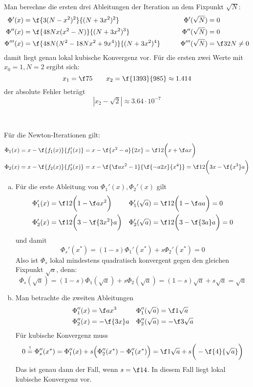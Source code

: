 \documentclass[a4paper]{scrartcl}
\begin{document}
\begin{aufgabe}
\begin{enumerate}[a)]
			Man berechne die ersten drei Ableitungen der Iteration an dem Fixpunkt $\sqrt{N}$:
			\begin{align*}
				\Phi'(x) &= \f {3(N-x^2)^2}{(N+3x^2)^2} & \Phi'(\sqrt N) &= 0 \\
				\Phi''(x) &= \f {48Nx(x^2-N)}{(N+3x^2)^3} & \Phi''(\sqrt N) &= 0 \\
				\Phi'''(x) &= \f {48N(N^2-18Nx^2+9x^4)}{(N+3x^2)^4} & \qquad \Phi'''(\sqrt N) &= \f 3{2N} \neq 0
			\end{align*}
			damit liegt genau lokal kubische Konvergenz vor.
			Für die ersten zwei Werte mit $x_0 = 1, N = 2$ ergibt sich:
			\[
				x_1 = \f 75 \qquad x_2 = \f {1393}{985} \approx 1.414
			\]
			der absolute Fehler beträgt
			\[
				|x_2 - \sqrt{2}| \approx 3.64 \cdot 10^{-7}
			\]
	\end{enumerate}
\end{aufgabe}

\begin{aufgabe}~

	Für die Newton-Iterationen gilt:
	\begin{align*}
		\Phi_1(x) &= x - \f {f_1(x)}{f_1'(x)} = x - \f {x^2-a}{2x} = \f 12 \bigg( x + \f ax \bigg) \\
		\Phi_2(x) &= x - \f {f_2(x)}{f_2'(x)} = x - \f {\f a{x^2}-1}{\f {-a2x}{x^4}} = \f 12 \bigg( 3x - \f {x^3}a \bigg)
	\end{align*}
	\begin{enumerate}[a)]
		\item
			Für die erste Ableitung von $\Phi_1'(x), \Phi_2'(x)$ gilt
			\begin{align*}
				\Phi_1'(x) &= \f 12 \bigg(1-\f a{x^2} \bigg) & \Phi_1'(\sqrt a) &= \f 12 \bigg(1 - \f aa \bigg) = 0 \\
				\Phi_2'(x) &= \f 12 \bigg(3-\f{3x^2}a \bigg) & \Phi_2'(\sqrt a) &= \f 12 \bigg(3 - \f {3a}a \bigg) = 0
			\end{align*}
			und damit
			\[
				\Phi_s'(x^*) = (1-s)\Phi_1'(x^*) + s \Phi_2'(x^*) = 0
			\]
			Also ist $\Phi_s$ lokal mindestens quadratisch konvergent gegen den gleichen Fixpunkt $\sqrt a$, denn:
			\[
				\Phi_s(\sqrt a) = (1-s)\Phi_1(\sqrt a) + s \Phi_2(\sqrt a) = (1-s)\sqrt a + s\sqrt a = \sqrt a
			\]
		\item
			Man betrachte die zweiten Ableitungen
			\begin{align*}
				\Phi_1''(x) &= \f a{x^3} & \Phi_1''(\sqrt a) &= \f 1{\sqrt a} \\
				\Phi_2''(x) &= - \f {3x}a & \Phi_2''(\sqrt a) &= - \f 3{\sqrt a}
			\end{align*}
			Für kubische Konvergenz muss
			\[
				0 \stackrel != \Phi_s''(x^*) = \Phi_1''(x) + s\Big(\Phi_2''(x^*) - \Phi_1''(x^*) \Big) = \f 1{\sqrt a} + s \bigg( -\f {4}{\sqrt a} \bigg) 
			\]
			Das ist genau dann der Fall, wenn $s = \f 14$.
			In diesem Fall liegt lokal kubische Konvergenz vor.
	\end{enumerate}
\end{aufgabe}
\end{document}
